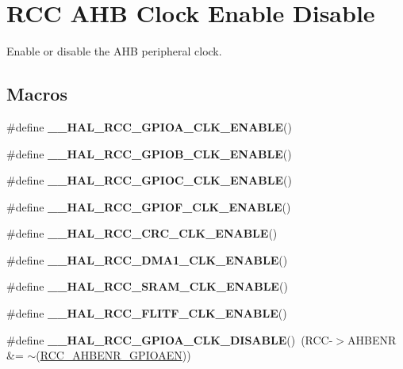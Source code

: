 \hypertarget{group___r_c_c___a_h_b___clock___enable___disable}{}\section{R\+CC A\+HB Clock Enable Disable}
\label{group___r_c_c___a_h_b___clock___enable___disable}


Enable or disable the A\+HB peripheral clock.  


\subsection*{Macros}
\begin{DoxyCompactItemize}
\item 
\#define {\bfseries \+\_\+\+\_\+\+H\+A\+L\+\_\+\+R\+C\+C\+\_\+\+G\+P\+I\+O\+A\+\_\+\+C\+L\+K\+\_\+\+E\+N\+A\+B\+LE}()
\item 
\#define {\bfseries \+\_\+\+\_\+\+H\+A\+L\+\_\+\+R\+C\+C\+\_\+\+G\+P\+I\+O\+B\+\_\+\+C\+L\+K\+\_\+\+E\+N\+A\+B\+LE}()
\item 
\#define {\bfseries \+\_\+\+\_\+\+H\+A\+L\+\_\+\+R\+C\+C\+\_\+\+G\+P\+I\+O\+C\+\_\+\+C\+L\+K\+\_\+\+E\+N\+A\+B\+LE}()
\item 
\#define {\bfseries \+\_\+\+\_\+\+H\+A\+L\+\_\+\+R\+C\+C\+\_\+\+G\+P\+I\+O\+F\+\_\+\+C\+L\+K\+\_\+\+E\+N\+A\+B\+LE}()
\item 
\#define {\bfseries \+\_\+\+\_\+\+H\+A\+L\+\_\+\+R\+C\+C\+\_\+\+C\+R\+C\+\_\+\+C\+L\+K\+\_\+\+E\+N\+A\+B\+LE}()
\item 
\#define {\bfseries \+\_\+\+\_\+\+H\+A\+L\+\_\+\+R\+C\+C\+\_\+\+D\+M\+A1\+\_\+\+C\+L\+K\+\_\+\+E\+N\+A\+B\+LE}()
\item 
\#define {\bfseries \+\_\+\+\_\+\+H\+A\+L\+\_\+\+R\+C\+C\+\_\+\+S\+R\+A\+M\+\_\+\+C\+L\+K\+\_\+\+E\+N\+A\+B\+LE}()
\item 
\#define {\bfseries \+\_\+\+\_\+\+H\+A\+L\+\_\+\+R\+C\+C\+\_\+\+F\+L\+I\+T\+F\+\_\+\+C\+L\+K\+\_\+\+E\+N\+A\+B\+LE}()
\item 
\mbox{\label{group___r_c_c___a_h_b___clock___enable___disable_ga7083e491e6a1e165d064d199304bd2f0}} 
\#define {\bfseries \+\_\+\+\_\+\+H\+A\+L\+\_\+\+R\+C\+C\+\_\+\+G\+P\+I\+O\+A\+\_\+\+C\+L\+K\+\_\+\+D\+I\+S\+A\+B\+LE}()~(R\+CC-\/$>$A\+H\+B\+E\+NR \&= $\sim$(\hyperlink{group___peripheral___registers___bits___definition_ga8909660b884f126ab1476daac7999619}{R\+C\+C\+\_\+\+A\+H\+B\+E\+N\+R\+\_\+\+G\+P\+I\+O\+A\+EN}))

\end{DoxyCompactItemize}
